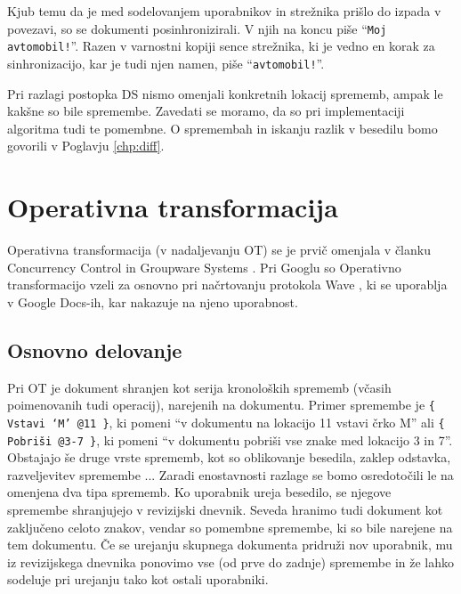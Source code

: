 \documentclass[a4paper, 12pt, twoside]{book}
\begin{document}
Kjub temu da je med sodelovanjem uporabnikov in strežnika prišlo do izpada v povezavi, so se dokumenti posinhronizirali. V njih na koncu piše “{\tt Moj avtomobil!}”. Razen v varnostni kopiji sence strežnika, ki je vedno en korak za sinhronizacijo, kar je tudi njen namen, piše “{\tt avtomobil!}”.

Pri razlagi postopka DS nismo omenjali konkretnih lokacij sprememb, ampak le kakšne so bile spremembe. Zavedati se moramo, da so pri implementaciji algoritma tudi te pomembne. O spremembah in iskanju razlik v besedilu bomo govorili v Poglavju \ref{chp:diff}.

\newpage

\section{Operativna transformacija}
\label{sec:ot}

Operativna transformacija (v nadaljevanju OT) se je prvič omenjala v članku Concurrency Control in Groupware Systems \cite{ccigs}. Pri Googlu so Operativno transformacijo vzeli za osnovno pri načrtovanju protokola Wave \cite{wave-ot}, ki se uporablja v Google Docs-ih, kar nakazuje na njeno uporabnost.

\subsection{Osnovno delovanje}

Pri OT je dokument shranjen kot serija kronoloških sprememb (včasih poimenovanih tudi operacij), narejenih na dokumentu. Primer spremembe je {\tt \{ Vstavi ‘M’ @11 \}}, ki pomeni “v dokumentu na lokacijo 11 vstavi črko M” ali {\tt \{ Pobriši @3-7 \}}, ki pomeni “v dokumentu pobriši vse znake med lokacijo 3 in 7”. Obstajajo še druge vrste sprememb, kot so oblikovanje besedila, zaklep odstavka, razveljevitev spremembe ... Zaradi enostavnosti razlage se bomo osredotočili le na omenjena dva tipa sprememb. Ko uporabnik ureja besedilo, se njegove spremembe shranjujejo v revizijski dnevnik. Seveda hranimo tudi dokument kot zaključeno celoto znakov, vendar so pomembne spremembe, ki so bile narejene na tem dokumentu. Če se urejanju skupnega dokumenta pridruži nov uporabnik, mu iz revizijskega dnevnika ponovimo vse (od prve do zadnje) spremembe in že lahko sodeluje pri urejanju tako kot ostali uporabniki.
\end{document}
